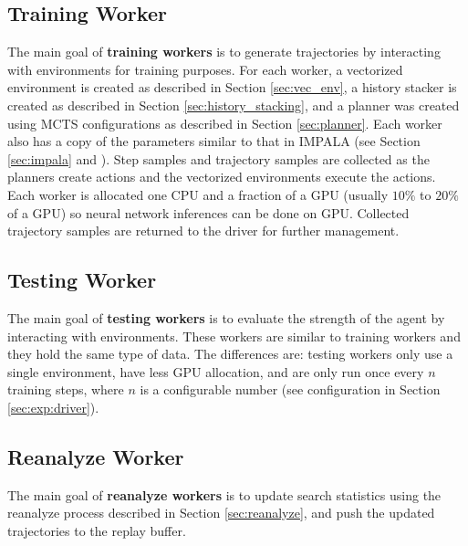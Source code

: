 
\subsection{Training Worker} \label{sec:train_rw}
The main goal of \textbf{training workers} is to generate trajectories by interacting with environments for training purposes.
For each worker, a vectorized environment is created as described in Section \ref{sec:vec_env}, a history stacker is created as described in Section \ref{sec:history_stacking}, and a planner was created using MCTS configurations as described in Section \ref{sec:planner}.
Each worker also has a copy of the parameters similar to that in IMPALA (see Section \ref{sec:impala} and \cite{IMPALAScalableDistributed_Espeholt.Soyer.ea_2018}).
Step samples and trajectory samples are collected as the planners create actions and the vectorized environments execute the actions.
Each worker is allocated one CPU and a fraction of a GPU (usually $10\% $ to $20\%$ of a GPU) so neural network inferences can be done on GPU.
Collected trajectory samples are returned to the driver for further management.

\subsection{Testing Worker} \label{sec:test_rw}
The main goal of \textbf{testing workers} is to evaluate the strength of the agent by interacting with environments.
These workers are similar to training workers and they hold the same type of data.
The differences are: testing workers only use a single environment, have less GPU allocation, and are only run once every $n$ training steps, where $n$ is a configurable number (see configuration in Section \ref{sec:exp:driver}).

\subsection{Reanalyze Worker} \label{sec:re_w}
The main goal of \textbf{reanalyze workers} is to update search statistics using the reanalyze process described in Section \ref{sec:reanalyze}, and push the updated trajectories to the replay buffer.

